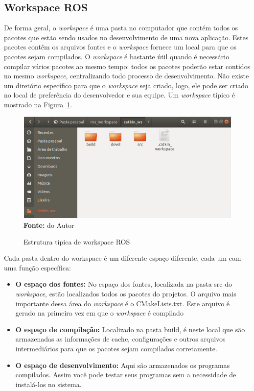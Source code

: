 \subsection{Workspace ROS}
De forma geral, o \textit{workspace} é uma pasta no computador que contém todos os pacotes que estão sendo usados no desenvolvimento de uma nova aplicação. Estes pacotes contêm os arquivos fontes e o \textit{workspace} fornece um local para que os pacotes sejam compilados. O \textit{workspace} é bastante útil quando é necessário compilar vários pacotes ao mesmo tempo: todos os pacotes poderão estar contidos no mesmo \textit{workspace}, centralizando todo processo de desenvolvimento. Não existe um diretório específico para que o \textit{workspace} seja criado, logo, ele pode ser criado no local de preferência do desenvolvedor e sua equipe. Um \textit{workspace} típico é mostrado na Figura~\ref{fig:rosworkspace}. 

\begin{figure}[ht]
	\caption{Estrutura típica de workspace ROS}
	\begin{center}
		\includegraphics[scale=0.43]{imagens/rosworkspace.png}\\
		{\small \textbf{Fonte:} do Autor}
    \end{center}\label{fig:rosworkspace}
\end{figure}

Cada pasta dentro do workspace é um diferente espaço diferente, cada um com uma função específica:

\begin{itemize}
    \item \textbf{O espaço dos fontes:} No espaço dos fontes, localizada na pasta src do \textit{workspace}, estão localizados todos os pacotes do projetos. O arquivo mais importante dessa área do \textit{workspace} é o CMakeLists.txt. Este arquivo é gerado na primeira vez em que o \textit{workspace} é compilado

    \item \textbf{O espaço de compilação:} Localizado na pasta build, é neste local que são armazenadas as informações de cache, configurações e outros arquivos intermediários para que os pacotes sejam compilados corretamente.

    \item \textbf{O espaço de desenvolvimento:} Aqui são armazenados os programas compilados. Assim você pode testar seus programas sem a necessidade de instalá-los no sistema.
\end{itemize}

